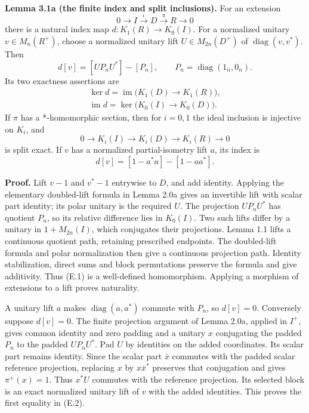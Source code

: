 \documentclass[
  11pt,
]{article}
\begin{document}
\textbf{Lemma 3.1a (the finite index and split inclusions).} For an
extension \[
0\longrightarrow I\xrightarrow{\iota}D\xrightarrow{\pi}R\longrightarrow0
\] there is a natural index map \(d:K_1(R)\to K_0(I)\). For a normalized
unitary \(v\in M_n(R^+)\), choose a normalized unitary lift
\(U\in M_{2n}(D^+)\) of \(\operatorname{diag}(v,v^*)\). Then \[
d[v]=[UP_nU^*]-[P_n],\qquad P_n=\operatorname{diag}(1_n,0_n).
\tag{E.1}
\] Its two exactness assertions are \[
\begin{gathered}
\ker d=\operatorname{im}\bigl(K_1(D)\to K_1(R)\bigr),\\
\operatorname{im}d=\ker\bigl(K_0(I)\to K_0(D)\bigr).
\end{gathered}
\tag{E.2}
\] If \(\pi\) has a *-homomorphic section, then for \(i=0,1\) the ideal
inclusion is injective on \(K_i\), and \[
0\longrightarrow K_i(I)\longrightarrow K_i(D)\longrightarrow K_i(R)\longrightarrow0
\tag{E.3}
\] is split exact. If \(v\) has a normalized partial-isometry lift
\(a\), its index is \[
d[v]=[1-a^*a]-[1-aa^*].
\tag{E.4}
\]

\textbf{Proof.} Lift \(v-1\) and \(v^*-1\) entrywise to \(D\), and add
identity. Applying the elementary doubled-lift formula in Lemma 2.0a
gives an invertible lift with scalar part identity; its polar unitary is
the required \(U\). The projection \(UP_nU^*\) has quotient \(P_n\), so
its relative difference lies in \(K_0(I)\). Two such lifts differ by a
unitary in \(1+M_{2n}(I)\), which conjugates their projections. Lemma
1.1 lifts a continuous quotient path, retaining prescribed endpoints.
The doubled-lift formula and polar normalization then give a continuous
projection path. Identity stabilization, direct sums and block
permutations preserve the formula and give additivity. Thus (E.1) is a
well-defined homomorphism. Applying a morphism of extensions to a lift
proves naturality.

A unitary lift \(a\) makes \(\operatorname{diag}(a,a^*)\) commute with
\(P_n\), so \(d[v]=0\). Conversely suppose \(d[v]=0\). The finite
projection argument of Lemma 2.0a, applied in \(I^+\), gives common
identity and zero padding and a unitary \(x\) conjugating the padded
\(P_n\) to the padded \(UP_nU^*\). Pad \(U\) by identities on the added
coordinates. Its scalar part remains identity. Since the scalar part
\(\bar x\) commutes with the padded scalar reference projection,
replacing \(x\) by \(x\bar x^*\) preserves that conjugation and gives
\(\pi^+(x)=1\). Thus \(x^*U\) commutes with the reference projection.
Its selected block is an exact normalized unitary lift of \(v\) with the
added identities. This proves the first equality in (E.2).
\end{document}
